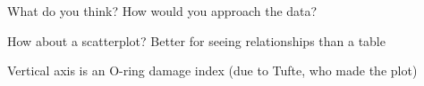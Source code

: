 \documentclass[pdflatex,landscape,titlepage]{foils}
\begin{document}
What do you think?  How would you approach the data?


How about a scatterplot?  Better for seeing relationships than a table

Vertical axis is an O-ring damage index (due to Tufte, who made the plot)
\end{document}
